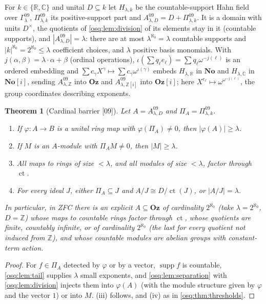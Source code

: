 \documentclass[11pt,letterpaper]{article}
\numberwithin{equation}{section}
\newtheorem{theorem}{Theorem}[section]
\theoremstyle{definition}
\theoremstyle{remark}
\theoremstyle{plain}
\newcommand{\No}{\mathbf{No}}
\newcommand{\Oz}{\mathbf{Oz}}
\newcommand{\SC}{\No[i]}
\newcommand{\GOz}{\Oz[i]}
\newcommand{\Z}{\mathbb Z}
\newcommand{\R}{\mathbb R}
\newcommand{\C}{\mathbb C}
\newcommand{\ct}{\operatorname{ct}}
\newcommand{\supp}{\operatorname{supp}}
\newcommand{\src}[1]{\textup{\textsf{[#1]}}}
\begin{document}
For $k\in\{\R,\C\}$ and unital $D\subseteq k$ let $H_{\lambda,k}$ be the countable-support Hahn field over
$\Gamma^{09}_\lambda$, $\Pi^{09}_{\lambda,k}$ its positive-support part and
$A^{09}_{\lambda,D}=D+\Pi^{09}_{\lambda,k}$. It is a domain with units $D^\times$, the quotients of
\cref{osq:lem:division} of its elements stay in it (countable supports), and $|A^{09}_{\lambda,D}|=\lambda$:
there are at most $\lambda^{\aleph_0}=\lambda$ countable supports and $|k|^{\aleph_0}=2^{\aleph_0}\le\lambda$
coefficient choices, and $\lambda$ positive basis monomials. With $j(\alpha,\beta)=\lambda\cdot\alpha+\beta$
(ordinal operations), $\iota(\sum q_\ell e_\ell)=\sum q_\ell\omega^{-j(\ell)}$ is an ordered embedding and
$\sum c_\gamma X^\gamma\mapsto\sum c_\gamma\omega^{\iota(\gamma)}$ embeds $H_{\lambda,\R}$ in $\No$ and
$H_{\lambda,\C}$ in $\SC$, sending $A^{09}_{\lambda,\Z}$ into $\Oz$ and $A^{09}_{\lambda,\Z[i]}$ into $\GOz$;
here $X^{e_\ell}\mapsto\omega^{\omega^{-j(\ell)}}$, the group coordinates describing exponents.

\begin{theorem}[Cardinal barrier \src{09}]\label{osq:thm:barrier}
Let $A=A^{09}_{\lambda,D}$ and $\Pi_A=\Pi^{09}_{\lambda,k}$.
\begin{enumerate}
\item If $\varphi:A\to B$ is a unital ring map with $\varphi(\Pi_A)\ne0$, then $|\varphi(A)|\ge\lambda$.
\item If $M$ is an $A$-module with $\Pi_AM\ne0$, then $|M|\ge\lambda$.
\item All maps to rings of size $<\lambda$, and all modules of size $<\lambda$, factor through $\ct$.
\item For every ideal $J$, either $\Pi_A\subseteq J$ and $A/J\cong D/\ct(J)$, or $|A/J|=\lambda$.
\end{enumerate}
In particular, in ZFC there is an explicit $A\subseteq\Oz$ of cardinality $2^{\aleph_0}$ (take
$\lambda=2^{\aleph_0}$, $D=\Z$) whose maps to countable rings factor through $\ct$, whose quotients are finite,
countably infinite, or of cardinality $2^{\aleph_0}$ (the last for every quotient not induced from $\Z$), and
whose countable modules are abelian groups with constant-term action.
\end{theorem}
\begin{proof}
For $f\in\Pi_A$ detected by $\varphi$ or by a vector, $\supp f$ is countable, \cref{osq:lem:tail} supplies
$\lambda$ small exponents, and \cref{osq:lem:separation} with \cref{osq:lem:division} injects them into
$\varphi(A)$ (with the module structure given by $\varphi$ and the vector $1$) or into $M$. (iii) follows,
and (iv) as in \cref{osq:thm:thresholds}.
\end{proof}
\end{document}
